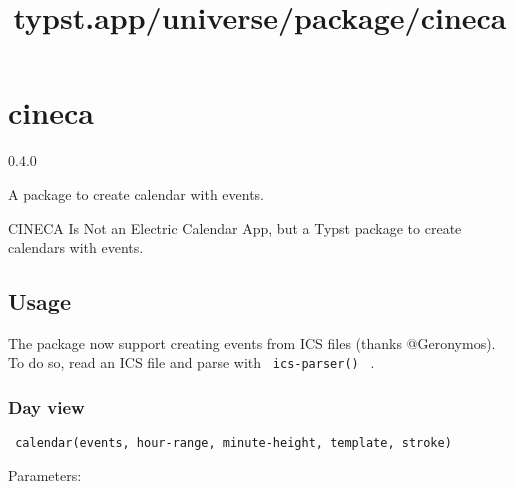 \title{typst.app/universe/package/cineca}

\label{banner}
\section{cineca}\label{cineca}

{ 0.4.0 }

A package to create calendar with events.

\label{readme}
CINECA Is Not an Electric Calendar App, but a Typst package to create
calendars with events.

\subsection{Usage}\label{usage}

The package now support creating events from ICS files (thanks
@Geronymos). To do so, read an ICS file and parse with
\texttt{\ ics-parser()\ } .

\begin{Shaded}
\begin{Highlighting}[]
\NormalTok{))}

\end{Highlighting}
\end{Shaded}

\subsubsection{Day view}\label{day-view}

\texttt{\ calendar(events,\ hour-range,\ minute-height,\ template,\ stroke)\ }

Parameters:


